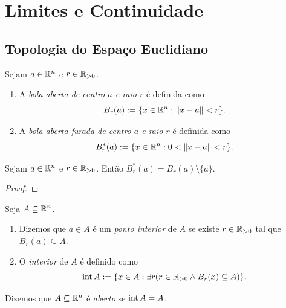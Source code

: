 
\chapter{Limites e Continuidade}

\section{Topologia do Espaço Euclidiano}

\begin{definition}
    Sejam $a \in \mathbb{R}^n$ e $r \in \mathbb{R}_{>0}$.
        \begin{enumerate}[leftmargin=*, align=left, label=\textbf{(\alph*)}]
            \item A \emph{bola aberta de centro $a$ e raio $r$} é definida como
                \[
                    B_r(a) := \{x \in \mathbb{R}^n : \|x-a\| < r\}.
                \]
            \item A \emph{bola aberta furada de centro $a$ e raio $r$} é definida como
                \[
                    B^*_r(a) := \{x \in \mathbb{R}^n : 0 < \|x-a\| < r\}.
                \]
        \end{enumerate}
\end{definition}

\begin{corollary}
    Sejam $a \in \mathbb{R}^n$ e $r \in \mathbb{R}_{>0}$. Então $B^*_r(a) = B_r(a) \setminus \{a\}$.
\end{corollary}

\begin{proof}
\end{proof}

\begin{definition}
    Seja $A \subseteq \mathbb{R}^n$.
        \begin{enumerate}[leftmargin=*, align=left, label=\textbf{(\alph*)}]
            \item Dizemos que $a \in A$ é um \emph{ponto interior} de $A$ se existe $r \in \mathbb{R}_{>0}$ tal que $B_r(a) \subseteq A$.
            \item O \emph{interior} de $A$ é definido como
                \[
                    \operatorname{int}{A} := \{ x \in A : \exists r (r \in \mathbb{R}_{>0} \land B_r(x) \subseteq A ) \}.
                \]
        \end{enumerate}
\end{definition}

\begin{definition}
    Dizemos que $A \subseteq \mathbb{R}^n$ é \emph{aberto} se $\operatorname{int}{A} = A$.
\end{definition}

